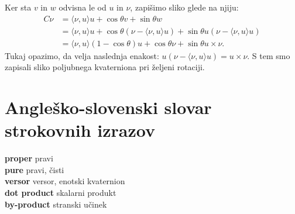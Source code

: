 \documentclass[a4paper,12pt]{article}
\newcommand{\geslo}[2]{\noindent\textbf{#1} \quad \hangindent=1cm #2\\[-1pc]}
\newcommand{\dotpr}[2]{\langle #1, #2 \rangle}
\begin{document}
Ker sta $v$ in $w$ odvisna le od $u$ in $\nu$, zapišimo sliko glede na njiju:
\begin{align*}
   C\nu &= \dotpr{\nu}{u}u + \cos\theta v + \sin\theta w\\
        &= \dotpr{\nu}{u}u + \cos\theta (\nu - \dotpr{\nu}{u}u) + \sin\theta u(\nu - \dotpr{\nu}{u}u)\\
        &= \dotpr{\nu}{u}(1 - \cos\theta)u + \cos\theta \nu + \sin\theta u\times\nu.
\end{align*}
Tukaj opazimo, da velja naslednja enakost: $u(\nu - \dotpr{\nu}{u}u) = u\times\nu$. S tem smo zapisali sliko poljubnega kvaterniona pri željeni rotaciji.


\section*{Angleško-slovenski slovar strokovnih izrazov}

\geslo{proper}{pravi}

\geslo{pure}{pravi, čisti}

\geslo{versor}{versor, enotski kvaternion}

\geslo{dot product}{skalarni produkt}

\geslo{by-product}{stranski učinek}



\end{document}
